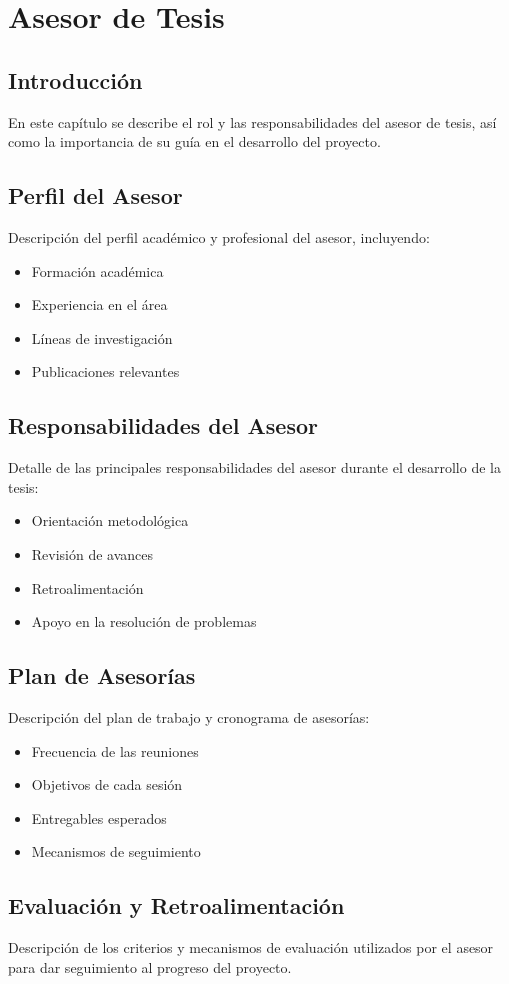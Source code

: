 \chapter{Asesor de Tesis}

\section{Introducción}
En este capítulo se describe el rol y las responsabilidades del asesor de tesis, así como la importancia de su guía en el desarrollo del proyecto.

\section{Perfil del Asesor}
Descripción del perfil académico y profesional del asesor, incluyendo:
\begin{itemize}
    \item Formación académica
    \item Experiencia en el área
    \item Líneas de investigación
    \item Publicaciones relevantes
\end{itemize}

\section{Responsabilidades del Asesor}
Detalle de las principales responsabilidades del asesor durante el desarrollo de la tesis:
\begin{itemize}
    \item Orientación metodológica
    \item Revisión de avances
    \item Retroalimentación
    \item Apoyo en la resolución de problemas
\end{itemize}

\section{Plan de Asesorías}
Descripción del plan de trabajo y cronograma de asesorías:
\begin{itemize}
    \item Frecuencia de las reuniones
    \item Objetivos de cada sesión
    \item Entregables esperados
    \item Mecanismos de seguimiento
\end{itemize}

\section{Evaluación y Retroalimentación}
Descripción de los criterios y mecanismos de evaluación utilizados por el asesor para dar seguimiento al progreso del proyecto.